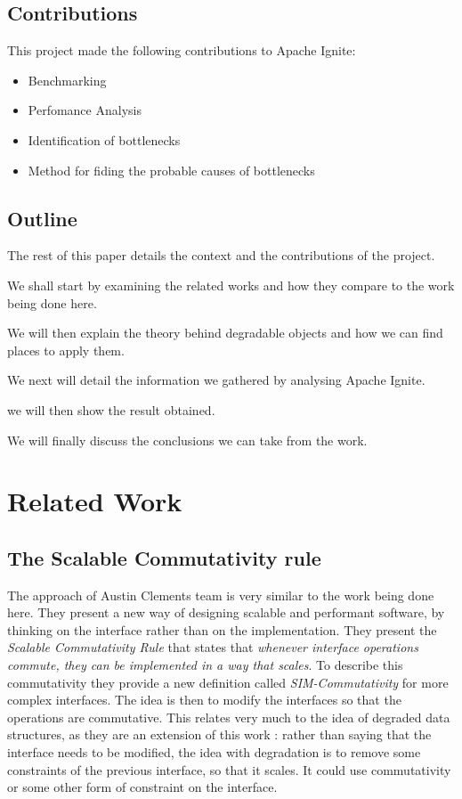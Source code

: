 \documentclass[conference]{IEEEtran}
\begin{document}
\subsection{Contributions}
This project made the following contributions to Apache Ignite:
\begin{itemize}
  \item Benchmarking
  \item Perfomance Analysis
  \item Identification of bottlenecks
  \item Method for fiding the probable causes of bottlenecks
\end{itemize}

\subsection{Outline}
The rest of this paper details the context and the contributions of the project.

We shall start by examining the related works and how they compare to the work being done here.

We will then explain the theory behind degradable objects and how we can find places to apply them.

We next will detail the information we gathered by analysing Apache Ignite.

we will then show the result obtained.

We will finally discuss the conclusions we can take from the work.

\bigbreak 

\section{Related Work}
\subsection{The Scalable Commutativity rule}
The approach of Austin Clements \cite{scalable} team is very similar to the work being done here. They present a new way of designing scalable and performant software, by thinking on the interface rather than on the implementation. They present the \textit{Scalable Commutativity Rule} that states that \textit{whenever interface operations commute, they can be implemented in a way that scales}. To describe this commutativity they provide a new definition called \textit{SIM-Commutativity} for more complex interfaces. The idea is then to modify the interfaces so that the operations are commutative. This relates very much to the idea of degraded data structures, as they are an extension of this work : rather than saying that the interface needs to be modified, the idea with degradation is to remove some constraints of the previous interface, so that it scales. It could use commutativity or some other form of constraint on the interface.
\end{document}

